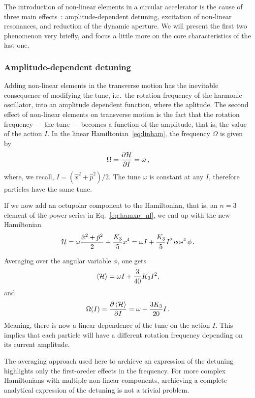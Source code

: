 The introduction of non-linear elements in a circular accelerator is the cause of three main effects~\cite{herr}: amplitude-dependent detuning, excitation of non-linear resonances, and reduction of the dynamic aperture. We will present the first two phenomenon very briefly, and focus a little more on the core characteristics of the last one.

\subsubsection{Amplitude-dependent detuning}

Adding non-linear elements in the transverse motion has the inevitable consequence of modifying the tune, i.e.\ the rotation frequency of the harmonic oscillator, into an amplitude dependent function, where the aplitude.
The second effect of non-linear elements on transverse motion is the fact that the rotation frequency --- the tune --- becomes a function of the amplitude, that is, the value of the action $I$. In the linear Hamiltonian~\eqref{eq:linham}, the frequency $\Omega$ is given by
\begin{equation}
	\Omega = \pdv{\mathcal{H}}{I} = \omega\,,
\end{equation}
where, we recall, $I=(\hat x^2 + \hat p^2)/2$. The tune $\omega$ is constant at any $I$, therefore particles have the same tune.

If we now add an octupolar component to the Hamiltonian, that is, an $n=3$ element of the power series in Eq.~\ref{eq:hamxp_nl}, we end up with the new Hamiltonian
\begin{equation}
	\mathcal{H} = \omega \frac{\hat x^2 + \hat p^2}{2} + \frac{K_3}{5} x^4 = \omega I + \frac{K_3}{5} I^2 \cos^4\phi\, .
\end{equation}

Averaging over the angular variable $\phi$, one gets
\begin{equation}
	\left<{\mathcal{H}}\right> = \omega I + \frac{3}{40}K_3 I^2,
\end{equation}
%
and
%
\begin{equation}
	\Omega(I) = \pdv{\left<{\mathcal{H}}\right>}{I} = \omega + \frac{3K_3}{20} I\,.
\end{equation}
Meaning, there is now a linear dependence of the tune on the action $I$. This implies that each particle will have a different rotation frequency depending on its current amplitude.

The averaging approach used here to archieve an expression of the detuning highlights only the first-oreder effects in the frequency. For more complex Hamiltonians with multiple non-linear components, archieving a complete analytical expression of the detuning is not a trivial problem.

